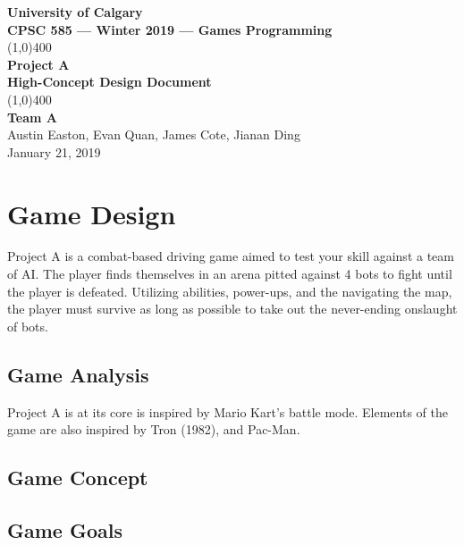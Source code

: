 \documentclass[12p]{article}
\newcommand{\name}{Project A}
\newcommand{\team}{Team A}
\newcommand{\botcount}{4}
\theoremstyle{definition}
\begin{document}
\begin{titlepage}
  \begin{center}
    \vspace*{1cm}
    \Large{\textbf{University of Calgary}}\\
    \Large{\textbf{CPSC 585 --- Winter 2019 --- Games Programming}}\\
    \vfill
    \line(1,0){400}\\[1mm]
    \huge{\textbf{\name{}}}\\
    \large{\textbf{High-Concept Design Document}}\\
    \line(1,0){400}\\
    \vfill
    \Large{\textbf{\team{}}}\\
    \Large{Austin Easton, Evan Quan, James Cote, Jianan Ding}\\
    \large{January 21, 2019}
  \end{center}
\end{titlepage}
\setcounter{page}{0}
\tableofcontents
{}
\break{}

\section{Game Design}

\name{} is a combat-based driving game aimed to test your skill against a team
of AI\@. The player finds themselves in an arena pitted against \botcount{}
bots to fight until the player is defeated. Utilizing abilities, power-ups, and
the navigating the map, the player must survive as long as possible to take out
the never-ending onslaught of bots.

\subsection{Game Analysis}

\name{} is at its core is inspired by Mario Kart's battle mode. Elements of the
game are also inspired by Tron (1982), and Pac-Man.

\subsection{Game Concept}
\subsection{Game Goals}
\end{document}
